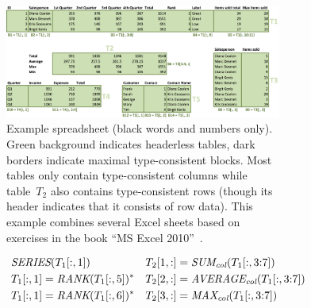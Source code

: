 \begin{figure}[thb]

  \begin{subfigure}{1\textwidth}
  \begin{center}
    \includegraphics[width=1\textwidth]{figures/Demo2.png}
  \end{center}
  \vspace{-10pt}
  \caption{
    Example spreadsheet (black words and numbers only).
    Green background indicates headerless tables, dark borders indicate maximal type-consistent blocks.
    Most tables only contain type-consistent columns while table~$T_2$ also contains type-consistent rows (though its header indicates that it consists of row data).
    This example combines several Excel sheets based on exercises in the book ``MS Excel 2010''~\cite{excel_book}.
  }
  \label{fig:main_example}
\end{subfigure}
\hfill
\begin{subfigure}{1\textwidth}
  {\scriptsize
    \begin{align*}
%
%
      &~\ecseries{\range{T_{1}}{\rangeall}{1}}                                  && \ecsumc{\range{T_{2}}{1}{\rangeall}}{\range{T_{1}}{\rangeall}{\rangeto{3}{7}}} \\
      &~\ecrank{\range{T_{1}}{\rangeall}{1}}{\range{T_{1}}{\rangeall}{5}}^*     && \ecaggc{\textit{AVERAGE}}{\range{T_{2}}{2}{\rangeall}}{\range{T_{1}}{\rangeall}{\rangeto{3}{7}}}  \\
      &~\ecrank{\range{T_{1}}{\rangeall}{1}}{\range{T_{1}}{\rangeall}{6}}^*     && \ecaggc{\textit{MAX}}{\range{T_{2}}{3}{\rangeall}}{\range{T_{1}}{\rangeall}{\rangeto{3}{7}}} \\

\end{align*}}
\end{subfigure}
\end{figure}
